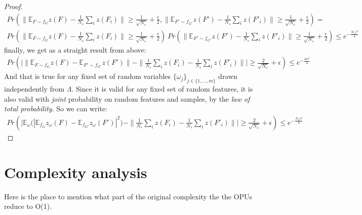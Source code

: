 \begin{proof}
\begin{align*}
    Pr( \| \mathbb{E}_{F \sim f_G} z(F) -  \frac{1}{{N_s}} \sum_i z(F_i) \| \geq \frac{1}{\sqrt{{N_s}}}+\frac{\epsilon}{2}, \|\mathbb{E}_{F' \sim f_{G'}} z(F') - \frac{1}{{N_s}} \sum_i z(F'_i)\|\geq\frac{1}{\sqrt{{N_s}}}+\frac{\epsilon}{2})=\\
    Pr( \| \mathbb{E}_{F \sim f_G} z(F) -  \frac{1}{{N_s}} \sum_i z(F_i) \| \geq \frac{1}{\sqrt{{N_s}}}+\frac{\epsilon}{2})~Pr( \|\mathbb{E}_{F' \sim f_{G'}} z(F') - \frac{1}{{N_s}} \sum_i z(F'_i)\|\geq\frac{1}{\sqrt{{N_s}}}+\frac{\epsilon}{2})\leq 
    e^{-\frac{{N_s}\epsilon^2}{4}}
\end{align*}
finally, we get as a straight result from above:
\begin{align*}
    Pr(\Big | \| \mathbb{E}_{F \sim f_G} z(F) - \mathbb{E}_{F' \sim f_{G'}} z(F')\| - \| \frac{1}{{N_s}} \sum_i z(F_i) - \frac{1}{{N_s}} \sum_i z(F'_i)\|\Big | \geq
    \frac{2}{\sqrt{{N_s}}}+\epsilon)\leq e^{-\frac{n\epsilon^2}{4}}
\end{align*}
And that is true for any fixed set of random variables  $\{\omega_j\}_{j \in \{1,\ldots, m\}}$ drawn independently from $\Lambda$.
Since it is valid for any fixed set of random features, it is also valid with \emph{joint} probability on random features and samples, by the \emph{law of total probability}. So we can write:
\begin{align*}
    Pr(\Big | \mathbb{E}_{\omega} \Big( | \mathbb{E}_{f_G} z_\omega(F) - \mathbb{E}_{f_{G'}} z_\omega(F') |^2 \Big) - \| \frac{1}{N_s} \sum_i z(F_i) - \frac{1}{N_s} \sum_i z(F'_i)\|\Big | \geq
    \frac{2}{\sqrt{N_s}}+\epsilon)\leq e^{-\frac{N_s\epsilon^2}{4}}
\end{align*}

\end{proof}

\section{Complexity analysis}
Here is the place to mention what part of the original complexity the the OPUs reduce to O(1).